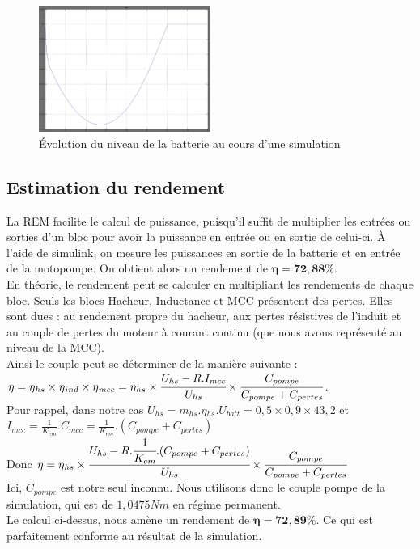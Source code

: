 \begin{figure}[ht]
	\begin{center}
	\includegraphics[width=0.5\textwidth]{images/Niveau_batt_inv.png}
	\caption{Évolution du niveau de la batterie au cours d'une simulation}\label{img:NivBatt}
	\end{center}
\end{figure}
\FloatBarrier 


\subsection{Estimation du rendement}
La REM facilite le calcul de puissance, puisqu'il suffit de multiplier les entrées ou sorties d'un bloc pour avoir la puissance en entrée ou en  sortie de celui-ci. À l'aide de simulink, on mesure les puissances en sortie de la batterie et en entrée de la motopompe. On obtient alors un rendement de $\mathbf{\eta = 72,88 \%}$.\\

En théorie, le rendement peut se calculer en multipliant les rendements de chaque bloc. Seuls les blocs Hacheur, Inductance et MCC présentent des pertes. Elles sont dues : au rendement propre du hacheur, aux pertes résistives de l'induit et au couple de pertes du moteur à courant continu (que nous avons représenté au niveau de la MCC).\\
Ainsi le couple peut se déterminer de la manière suivante : \\
$\eta = \eta{}_{hs} \times \eta{}_{ind} \times \eta{}_{mcc} = \eta{}_{hs} \times \cfrac{U_{hs}-R.I_{mcc}}{U_{hs}} \times \cfrac{C_{pompe}}{C_{pompe}+C_{pertes}}$.\\
Pour rappel, dans notre cas $ U_{hs} = m_{hs}.\eta{}_{hs}.U_{batt} = 0,5\times0,9\times43,2 $ et $ I_{mcc} = \frac{1}{K_{em}}.C_{mcc} = \frac{1}{K_{em}}.(C_{pompe}+C_{pertes})$\\
Donc $\eta = \eta{}_{hs} \times \cfrac{U_{hs}-R.\cfrac{1}{K_{em}}.(C_{pompe}+C_{pertes})}{U_{hs}} \times \cfrac{C_{pompe}}{C_{pompe}+C_{pertes}}$\\

Ici, $C_{pompe}$ est notre seul inconnu. Nous utilisons donc le couple pompe de la simulation, qui est de $1,0475Nm$ en régime permanent.\\
Le calcul ci-dessus, nous amène un rendement de $\mathbf{\eta = 72,89 \%}$. Ce qui est parfaitement conforme au résultat de la simulation.\\